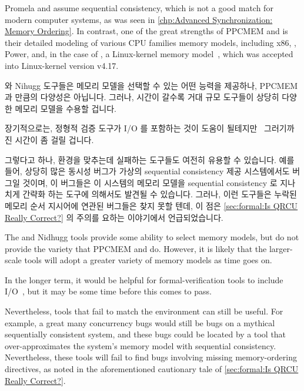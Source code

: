 Promela and  assume sequential consistency, which is not a
good match for modern computer systems, as was seen in
\cref{chp:Advanced Synchronization: Memory Ordering}.
In contrast, one of the great strengths of PPCMEM and 
is their detailed modeling of various CPU families memory models,
including x86, \ARM, Power, and, in the case of ,
a Linux-kernel memory model~\cite{Alglave:2018:FSC:3173162.3177156},
which was accepted into Linux-kernel version v4.17.

\fi

 와 Nihugg 도구들은 메모리 모델을 선택할 수 있는 어떤 능력을 제공하나,
PPCMEM 과  만큼의 다양성은 아닙니다.
그러나, 시간이 갈수록 거대 규모 도구들이 상당히 다양한 메모리 모델을 수용할
겁니다.

장기적으로는, 정형적 검증 도구가 I/O 를 포함하는 것이 도움이
될테지만~\cite{PaulEMcKenney2016LinuxKernelMMIO} 그러기까진 시간이 좀 걸릴
겁니다.

그렇다고 하나, 환경을 맞추는데 실패하는 도구들도 여전히 유용할 수 있습니다.
예를 들어, 상당히 많은 동시성 버그가 가상의 sequential consistency 제공
시스템에서도 버그일 것이며, 이 버그들은 이 시스템의 메모리 모델을 sequential
consistency 로 지나치게 간략화 하는 도구에 의해서도 발견될 수 있습니다.
그러나, 이런 도구들은 누락된 메모리 순서 지시어에 연관된 버그들은 찾지 못할
텐데, 이 점은
\cref{sec:formal:Is QRCU Really Correct?} 의 주의를 요하는 이야기에서
언급되었습니다.

\iffalse

The  and Nidhugg tools provide some ability to select
memory models, but do not provide the variety that PPCMEM and
 do.
However, it is likely that the larger-scale tools will adopt
a greater variety of memory models as time goes on.

In the longer term, it would be helpful for formal-verification
tools to include I/O~\cite{PaulEMcKenney2016LinuxKernelMMIO},
but it may be some time before this comes to pass.

Nevertheless, tools that fail to match the environment can still
be useful.
For example, a great many concurrency bugs would still be bugs on
a mythical sequentially consistent system, and these bugs could
be located by a tool that over-approximates the system's memory model
with sequential consistency.
Nevertheless, these tools will fail to find bugs involving missing
memory-ordering directives, as noted in the aforementioned
cautionary tale of
\cref{sec:formal:Is QRCU Really Correct?}.

